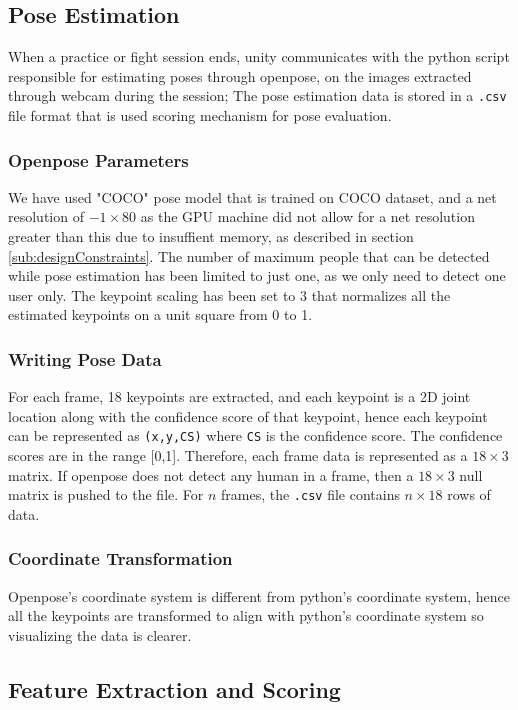 \subsection{Pose Estimation}
When a practice or fight session ends, unity communicates with the python script responsible for estimating poses through openpose, on the images extracted through webcam during the session; %
The pose estimation data is stored in a \texttt{.csv} file format that is used scoring mechanism for pose evaluation. 

\subsubsection{Openpose Parameters}
We have used "COCO" pose model that is trained on COCO dataset, and a net resolution of $-1 \times 80$ as the GPU machine did not allow for a net resolution greater than this due to insuffient memory, as described in section \ref{sub:designConstraints}. The number of maximum people that can be detected while pose estimation has been limited to just one, as we only need to detect one user only. The keypoint scaling has been set to 3 that normalizes all the estimated keypoints on a unit square from 0 to 1. 

\subsubsection{Writing Pose Data}

For each frame, 18 keypoints are extracted, and each keypoint is a 2D joint location along with the confidence score of that keypoint, hence each keypoint can be represented as \texttt{(x,y,CS)} where \texttt{CS} is the confidence score. The confidence scores are in the range [0,1]. Therefore, each frame data is represented as a $18 \times 3$ matrix. If openpose does not detect any human in a frame, then a $18 \times 3$ null matrix is pushed to the file. For $n$ frames, the \texttt{.csv} file contains $n \times 18$ rows of data. 

\subsubsection{Coordinate Transformation}
Openpose's coordinate system is different from python's coordinate system, hence all the keypoints are transformed to align with python's coordinate system so visualizing the data is clearer. 

\subsection{Feature Extraction and Scoring}

